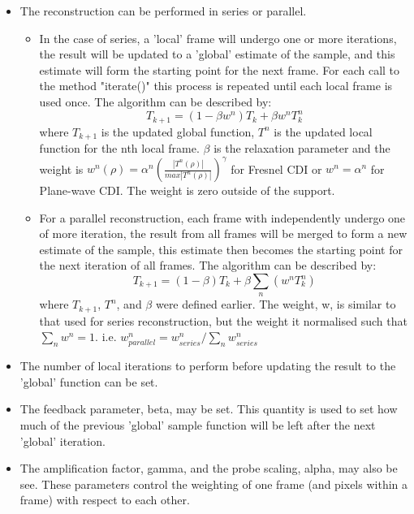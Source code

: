 \documentclass[]{nadia}
\begin{document}
\begin{itemize}

  \item The reconstruction can be performed in series or parallel.
    \begin{itemize}

      \item In the case of series, a
	'local' frame will undergo one or more iterations, the result
	will be updated to a 'global' estimate of the sample, and this
	estimate will form the starting point for the next frame. For
	each call to the method "iterate()" this process is repeated
	until each local frame is used once. The algorithm can be
	described by:
	\[ T_{k+1} = (1-\beta w^n)T_k + \beta w^n T^n_k \] 
	where $T_{k+1}$ is the updated global function, $T^n$ is the
	updated local function for the nth local frame. $\beta$ is the
	relaxation parameter and the weight is $ w^n(\rho) = \alpha^n
	(\frac{|T^n(\rho)|}{max|T^n(\rho)|} )^\gamma $ for Fresnel CDI
	or $w^n = \alpha^n$ for Plane-wave CDI. The weight is zero
	outside of the support.

      \item For a parallel reconstruction, each frame with
	independently undergo one of more iteration, the result from all
	frames will be merged to form a new estimate of the sample, this
	estimate then becomes the starting point for the next iteration
	of all frames. The algorithm can be described by:
	\[T_{k+1} = (1-\beta)T_k + \beta \sum_n(w^n T^n_k)\]
	where $T_{k+1}$, $T^n$, and $\beta$ were defined
	earlier. The weight, w, is similar to that used for series
	reconstruction, but the weight it normalised such that 
	$ \sum_n w^n = 1 $.  i.e. $ w^n_{parallel}= w^n_{series} / \sum_n w^n_{series} $

    \end{itemize}

  \item The number of local iterations to perform before updating the
    result to the 'global' function can be set.

  \item The feedback parameter, beta, may be set. This quantity is used
    to set how much of the previous 'global' sample function will be
    left after the next 'global' iteration.

  \item The amplification factor, gamma, and the probe scaling, alpha,
    may also be see. These parameters control the weighting of one frame
    (and pixels within a frame) with respect to each other.

\end{itemize}
\end{document}
